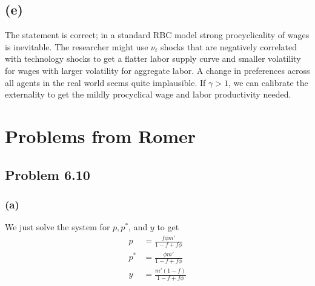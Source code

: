 \documentclass[11pt]{amsart}
\begin{document}
 \subsection*{(e)}
 The statement is correct; in a standard RBC model strong procyclicality of wages is inevitable. 
 The researcher might use $\nu_t$ shocks that are negatively correlated with technology shocks to get a flatter labor supply curve and smaller volatility for wages with larger volatility for aggregate labor. 
A change in preferences across all agents in the real world seems quite implausible.	If $\gamma > 1$, we can calibrate the externality to get the mildly procyclical wage and labor productivity needed. 


\section{Problems from Romer}
\subsection{Problem 6.10}

\subsubsection*{(a)} We just solve the system for $p, p^{*}$, and $y$ to get 
	\begin{align*}
	p & = \frac{f \phi m'}{1 - f + f\phi} \\
	p^{*} & = \frac{\phi m'}{1 - f + f\phi} \\
	y & = \frac{m' (1-f)}{1 - f + f\phi}
	\end{align*}
	
\end{document}

